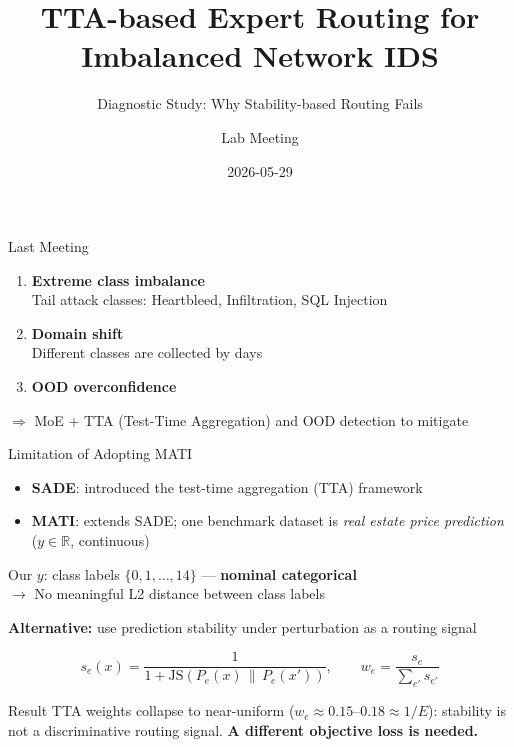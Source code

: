 \documentclass[aspectratio=169]{beamer}
\title{TTA-based Expert Routing for Imbalanced Network IDS}
\subtitle{Diagnostic Study: Why Stability-based Routing Fails}
\author{Lab Meeting}
\date{2026-05-29}
\institute{Dataset: CIC-IDS2017 \quad (2.8M samples, 15 classes)}
\begin{document}
\begin{frame}
  \titlepage
\end{frame}

\begin{frame}{Last Meeting}
  \begin{enumerate}
    \item \textbf{Extreme class imbalance}\\
      Tail attack classes: Heartbleed, Infiltration, SQL Injection
    \vspace{0.4em}
    \item \textbf{Domain shift}\\
      Different classes are collected by days
    \vspace{0.4em}
    \item \textbf{OOD overconfidence}
  \end{enumerate}

  \vspace{0.6em}
  \begin{block}{}
    $\Rightarrow$ MoE + TTA (Test-Time Aggregation) and OOD detection to mitigate
  \end{block}
\end{frame}

\begin{frame}{Limitation of Adopting MATI}
  \begin{itemize}
    \item \textbf{SADE}: introduced the test-time aggregation (TTA) framework
    \item \textbf{MATI}: extends SADE; one benchmark dataset is
          \textit{real estate price prediction}
          \quad ($y \in \mathbb{R}$, continuous)
  \end{itemize}

  \vspace{0.3em}
  Our $y$: class labels $\{0, 1, \ldots, 14\}$ --- \textbf{nominal categorical}\\
  $\rightarrow$ No meaningful L2 distance between class labels

  \vspace{0.4em}
  \textbf{Alternative:} use prediction stability under perturbation as a routing signal

  \vspace{0.3em}
  \[
    s_e(x) = \frac{1}{1 + \mathrm{JS}\!\left(P_e(x) \,\|\, P_e(x')\right)},
    \qquad
    w_e = \frac{s_e}{\displaystyle\sum_{e'} s_{e'}}
  \]

  \vspace{0.3em}
  \begin{alertblock}{Result}
    TTA weights collapse to near-uniform ($w_e \approx 0.15$--$0.18 \approx 1/E$):
    stability is not a discriminative routing signal.
    \textbf{A different objective loss is needed.}
  \end{alertblock}
\end{frame}
\end{document}
